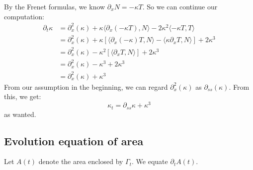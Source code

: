 \documentclass{article}
\begin{document}
By the Frenet formulas, we know $\partial_x N = -\kappa T$. So we can continue our computation:
\begin{align*}
	\partial_t \kappa &= \partial_x^2 (\kappa) + \kappa\langle \partial_x(-\kappa T), N\rangle - 2\kappa^2\langle -\kappa T, T\rangle \\
		&= \partial_x^2 (\kappa) + \kappa[\langle \partial_x (-\kappa)T, N\rangle - \langle \kappa \partial_x T, N\rangle] + 2\kappa^3 \\
		&= \partial_x^2 (\kappa) - \kappa^2[\langle \partial_x T, N\rangle] + 2\kappa^3 \\
		&= \partial_x^2 (\kappa) - \kappa^3 + 2\kappa^3 \\
		&= \partial_x^2 (\kappa) + \kappa^3
\end{align*}
From our assumption in the beginning, we can regard $\partial_x^2 (\kappa)$ as $\partial_{ss} (\kappa)$. From this, we get:
\[ \kappa_t = \partial_{ss} \kappa + \kappa^3 \]
as wanted.

\subsection{Evolution equation of area}

Let $A(t)$ denote the area enclosed by $\Gamma_t$. We equate $\partial_t A(t)$.\\
\end{document}
